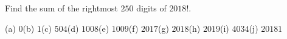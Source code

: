 Find the sum of the rightmost $250$ digits of $2018!$.

(a) $0$\quad (b) $1$\quad (c) $504$\quad (d) $1008$\quad (e) $1009$\quad (f) $2017$\quad (g) $2018$\quad (h) $2019$\quad (i) $4034$\quad (j) $20181$
